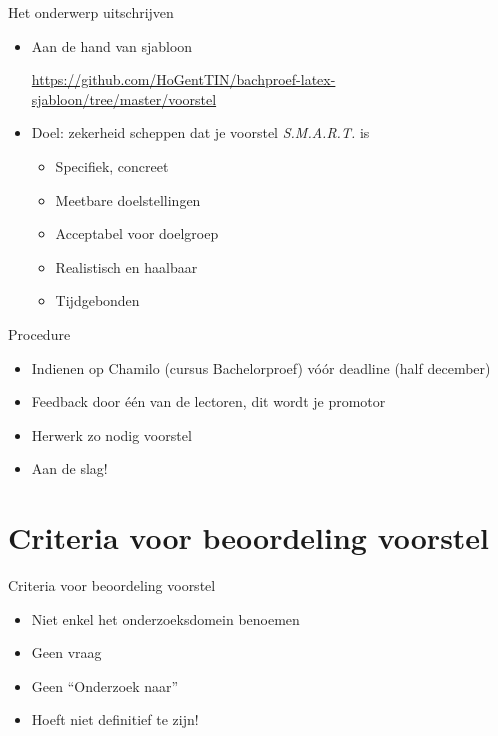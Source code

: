 \documentclass[usenames,dvipsnames]{beamer}
\begin{document}
\begin{frame}{Het onderwerp uitschrijven}

  \begin{itemize}
    \item Aan de hand van sjabloon
    
    \url{https://github.com/HoGentTIN/bachproef-latex-sjabloon/tree/master/voorstel}
    
    \item Doel: zekerheid scheppen dat je voorstel \emph{S.M.A.R.T.} is
    \begin{itemize}
      \item Specifiek, concreet
      \item Meetbare doelstellingen
      \item Acceptabel voor doelgroep
      \item Realistisch en haalbaar
      \item Tijdgebonden
    \end{itemize}
  \end{itemize}
\end{frame}

\begin{frame}{Procedure}

\begin{itemize}
  \item Indienen op Chamilo (cursus Bachelorproef) vóór deadline (half december)
  \item Feedback door één van de lectoren, dit wordt je promotor
  \item Herwerk zo nodig voorstel
  \item Aan de slag!
\end{itemize}
\end{frame}

\section{Criteria voor beoordeling voorstel}
\sectionframe{}

\begin{frame}{Criteria voor beoordeling voorstel}


\begin{itemize}
  \item Niet enkel het onderzoeksdomein benoemen
  \item Geen vraag
  \item Geen ``Onderzoek naar''
  \item Hoeft niet definitief te zijn!
\end{itemize}


%

\end{frame}
\end{document}
